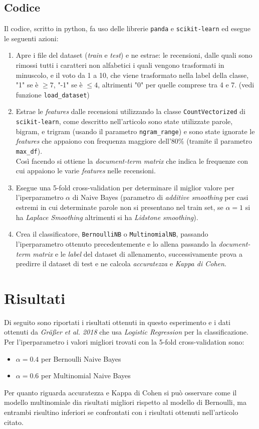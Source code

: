 \documentclass{article}
\begin{document}
\subsection{Codice}
Il codice, scritto in python, fa uso delle librerie \texttt{panda} e \texttt{scikit-learn}
ed esegue le seguenti azioni:
\begin{enumerate}
	\item Apre i file del dataset (\textit{train} e \textit{test}) e ne estrae:
	      le recensioni, dalle quali sono rimossi tutti i caratteri non alfabetici i quali
	      vengono trasformati in minuscolo, e il voto da 1 a 10, che viene trasformato
	      nella label della classe, "1" se è $\geq7$, "-1" se è $\leq4$,
	      altrimenti "0" per quelle comprese tra 4 e 7.
	      (vedi funzione \texttt{load\_dataset})
	\item Estrae le \textit{features} dalle recensioni utilizzando la classe
	      \texttt{CountVectorized} di \texttt{scikit-learn}, come descritto nell'articolo
	      sono state utilizzate parole, bigram, e trigram (usando il parametro
	      \texttt{ngram\_range}) e sono state ignorate le \textit{features} che appaiono
	      con frequenza maggiore dell'80\% (tramite il parametro \texttt{max\_df}).\\
	      Così facendo si ottiene la \textit{document-term matrix} che indica le frequenze
	      con cui appaiono le varie \textit{features} nelle recensioni.
	\item Esegue una 5-fold cross-validation per determinare il miglior valore per
	      l'iperparametro $\alpha$ di Naive Bayes (parametro di \textit{additive smoothing}
	      per casi estremi in cui determinate parole non si presentano nel train set,
	      se $\alpha=1$ si ha \textit{Laplace Smoothing} altrimenti si ha
	      \textit{Lidstone smoothing}).
	\item Crea il classificatore, \texttt{BernoulliNB} o \texttt{MultinomialNB}, passando
	      l'iperparametro ottenuto precedentemente e lo allena passando la
	      \textit{document-term matrix} e le \textit{label} del dataset di allenamento,
	      successivamente prova a predirre il dataset di test e ne calcola
	      \textit{accuratezza} e \textit{Kappa di Cohen}.
\end{enumerate}

\section{Risultati}
Di seguito sono riportati i risultati ottenuti in questo esperimento e i dati ottenuti da
\textit{Gräßer et al. 2018} che usa \textit{Logistic Regression} per la classificazione.
Per l'iperparametro i valori migliori trovati con la 5-fold cross-validation sono:
\begin{itemize}
	\item $\alpha=0.4$ per Bernoulli Naive Bayes
	\item $\alpha=0.6$ per Multinomial Naive Bayes
\end{itemize}
Per quanto riguarda accuratezza e Kappa di Cohen si può osservare come il modello multinomiale
dia risultati migliori rispetto al modello di Bernoulli, ma entrambi risultino inferiori
se confrontati con i risultati ottenuti nell'articolo citato.
\end{document}
